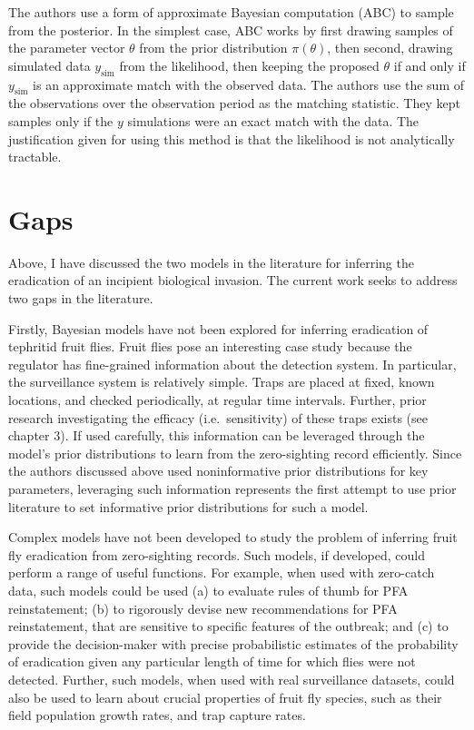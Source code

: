 \documentclass[
  oneside]{book}
\begin{document}
The authors use a form of approximate Bayesian computation (ABC) to sample from the posterior. In the simplest case, ABC works by first drawing samples of the parameter vector \(\theta\) from the prior distribution \(\pi(\theta)\), then second, drawing simulated data \(y_{\text{sim}}\) from the likelihood, then keeping the proposed \(\theta\) if and only if \(y_{\text{sim}}\) is an approximate match with the observed data. The authors use the sum of the observations over the observation period as the matching statistic. They kept samples only if the \(y\) simulations were an exact match with the data. The justification given for using this method is that the likelihood is not analytically tractable.

\hypertarget{gaps}{%
\section{Gaps}\label{gaps}}

Above, I have discussed the two models in the literature for inferring the eradication of an incipient biological invasion. The current work seeks to address two gaps in the literature.

Firstly, Bayesian models have not been explored for inferring eradication of tephritid fruit flies. Fruit flies pose an interesting case study because the regulator has fine-grained information about the detection system. In particular, the surveillance system is relatively simple. Traps are placed at fixed, known locations, and checked periodically, at regular time intervals. Further, prior research investigating the efficacy (i.e.~sensitivity) of these traps exists (see chapter 3). If used carefully, this information can be leveraged through the model's prior distributions to learn from the zero-sighting record efficiently. Since the authors discussed above used noninformative prior distributions for key parameters, leveraging such information represents the first attempt to use prior literature to set informative prior distributions for such a model.

Complex models have not been developed to study the problem of inferring fruit fly eradication from zero-sighting records. Such models, if developed, could perform a range of useful functions. For example, when used with zero-catch data, such models could be used (a) to evaluate rules of thumb for PFA reinstatement; (b) to rigorously devise new recommendations for PFA reinstatement, that are sensitive to specific features of the outbreak; and (c) to provide the decision-maker with precise probabilistic estimates of the probability of eradication given any particular length of time for which flies were not detected. Further, such models, when used with real surveillance datasets, could also be used to learn about crucial properties of fruit fly species, such as their field population growth rates, and trap capture rates.
\end{document}
